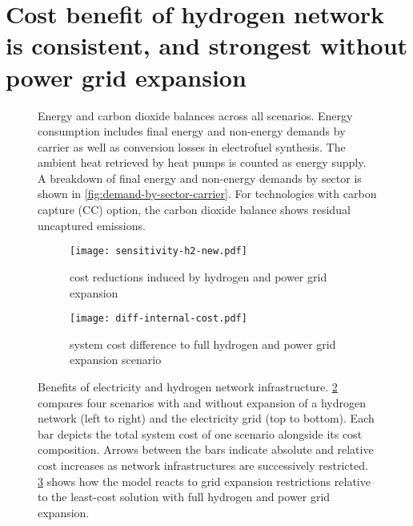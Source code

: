\section*{Cost benefit of hydrogen network is consistent, and strongest without power grid expansion}
\label{sec:h2}

\begin{figure}
    \centering
     \caption{ Energy and carbon dioxide balances across all scenarios. Energy
    consumption includes final energy and non-energy demands by carrier as well
    as conversion losses in electrofuel synthesis. The ambient heat retrieved by
    heat pumps is counted as energy supply. A breakdown of final energy and
    non-energy demands by sector is shown in
    \cref{fig:demand-by-sector-carrier}. For technologies with carbon capture (CC)
    option,  the carbon dioxide
    balance shows residual uncaptured emissions. }
    \label{fig:balance}
\end{figure}

\begin{figure}
    \centering
    \begin{subfigure}[t]{\textwidth}
        \centering
        \caption{cost reductions induced by hydrogen and power grid expansion}
        \texttt{[image: sensitivity-h2-new.pdf]}
        \label{fig:sensitivity-h2-a}
    \end{subfigure}
    \begin{subfigure}[t]{\textwidth}
        \centering
        \caption{system cost difference to full hydrogen and power grid expansion scenario}
        \texttt{[image: diff-internal-cost.pdf]}
        \label{fig:sensitivity-h2-b}
    \end{subfigure}
    \caption{Benefits of electricity and hydrogen network infrastructure.
    \cref{fig:sensitivity-h2-a} compares four scenarios with and without
    expansion of a hydrogen network (left to right) and the electricity grid
    (top to bottom). Each bar depicts the total system cost of one scenario
    alongside its cost composition. Arrows between the bars indicate absolute
    and relative cost increases as network infrastructures are successively
    restricted. \cref{fig:sensitivity-h2-b} shows how the model reacts to grid
    expansion restrictions relative to the least-cost solution with full hydrogen and power grid expansion.}
    \label{fig:sensitivity-h2}
\end{figure}

